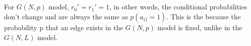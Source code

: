 \subsection{}
For $G(N,p)$ model, $r_0' = r_1' = 1$, in other words, the conditional probabilities don't change and are always the same as $p(a_{ij} = 1)$. This is the because the probability p that an edge exists in the $G(N,p)$ model is fixed, unlike in the $G(N,L)$ model.

\subsection{}